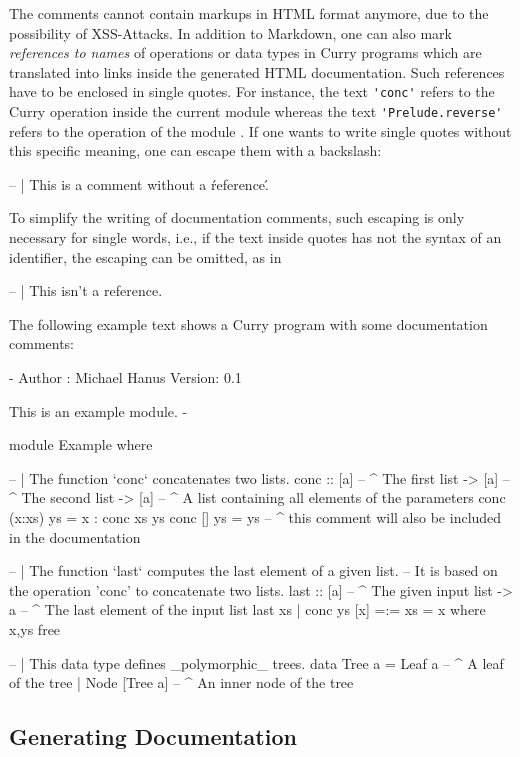 The comments cannot contain markups in HTML format anymore,
due to the possibility of XSS-Attacks.
In addition to Markdown,
one can also mark \emph{references to names} of operations or data types
in Curry programs which are translated into links inside
the generated HTML documentation. Such references have to be
enclosed in single quotes. For instance, the text
\verb!'conc'! refers to the Curry operation 
inside the current module whereas the text
\verb!'Prelude.reverse'! refers to the operation 
of the module .
If one wants to write single quotes without this specific
meaning, one can escape them with a backslash:
\begin{curry}
-- | This is a comment without a \'reference\'.
\end{curry}
To simplify the writing of documentation comments,
such escaping is only necessary for single words,
i.e., if the text inside quotes has not the syntax of
an identifier, the escaping can be omitted, as in
\begin{curry}
-- | This isn't a reference.
\end{curry}
%
The following example text shows a Curry program with some
documentation comments:
\begin{curry}
{-  Author : Michael Hanus
    Version: 0.1

    This is an
    example module.
-}
module Example where

-- | The function `conc` concatenates two lists.
conc :: [a] -- ^ The first list
     -> [a] -- ^ The second list
     -> [a] -- ^ A list containing all elements of the parameters
conc (x:xs) ys = x : conc xs ys
conc []     ys = ys
--  ^ this comment will also be included in the documentation

-- | The function `last` computes the last element of a given list.
--   It is based on the operation 'conc' to concatenate two lists.
last :: [a] -- ^ The given input list
     -> a   -- ^ The last element of the input list
last xs | conc ys [x] =:= xs  = x   where x,ys free

-- | This data type defines _polymorphic_ trees.
data Tree a = Leaf a -- ^ A leaf of the tree
            | Node [Tree a] -- ^ An inner node of the tree
\end{curry}

\subsection{Generating Documentation}


